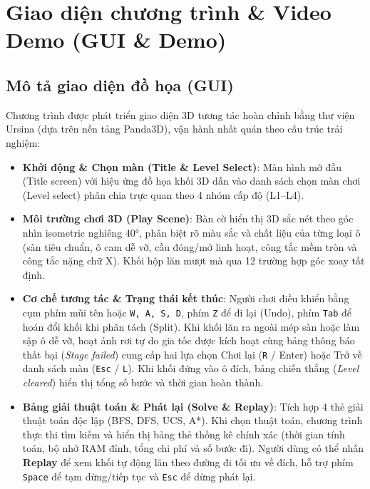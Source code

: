 \documentclass[12pt,a4paper]{article}
\begin{document}
\section{Giao diện chương trình \& Video Demo (GUI \& Demo)}

\subsection{Mô tả giao diện đồ họa (GUI)}
Chương trình được phát triển giao diện 3D tương tác hoàn chỉnh bằng thư viện Ursina (dựa trên nền tảng Panda3D), vận hành nhất quán theo cấu trúc trải nghiệm:
\begin{itemize}
    \item \textbf{Khởi động \& Chọn màn (Title \& Level Select)}: Màn hình mở đầu (Title screen) với hiệu ứng đồ họa khối 3D dẫn vào danh sách chọn màn chơi (Level select) phân chia trực quan theo 4 nhóm cấp độ (L1--L4).
    \item \textbf{Môi trường chơi 3D (Play Scene)}: Bàn cờ hiển thị 3D sắc nét theo góc nhìn isometric nghiêng 40°, phân biệt rõ màu sắc và chất liệu của từng loại ô (sàn tiêu chuẩn, ô cam dễ vỡ, cầu đóng/mở linh hoạt, công tắc mềm tròn và công tắc nặng chữ X). Khối hộp lăn mượt mà qua 12 trường hợp góc xoay tất định.
    \item \textbf{Cơ chế tương tác \& Trạng thái kết thúc}: Người chơi điều khiển bằng cụm phím mũi tên hoặc \texttt{W, A, S, D}, phím \texttt{Z} để đi lại (Undo), phím \texttt{Tab} để hoán đổi khối khi phân tách (Split). Khi khối lăn ra ngoài mép sàn hoặc làm sập ô dễ vỡ, hoạt ảnh rơi tự do gia tốc được kích hoạt cùng bảng thông báo thất bại (\textit{Stage failed}) cung cấp hai lựa chọn Chơi lại (\texttt{R} / Enter) hoặc Trở về danh sách màn (\texttt{Esc} / \texttt{L}). Khi khối đứng vào ô đích, bảng chiến thắng (\textit{Level cleared}) hiển thị tổng số bước và thời gian hoàn thành.
    \item \textbf{Bảng giải thuật toán \& Phát lại (Solve \& Replay)}: Tích hợp 4 thẻ giải thuật toán độc lập (BFS, DFS, UCS, A*). Khi chọn thuật toán, chương trình thực thi tìm kiếm và hiển thị bảng thẻ thống kê chính xác (thời gian tính toán, bộ nhớ RAM đỉnh, tổng chi phí và số bước đi). Người dùng có thể nhấn \textbf{Replay} để xem khối tự động lăn theo đường đi tối ưu về đích, hỗ trợ phím \texttt{Space} để tạm dừng/tiếp tục và \texttt{Esc} để dừng phát lại.
\end{itemize}
\end{document}

